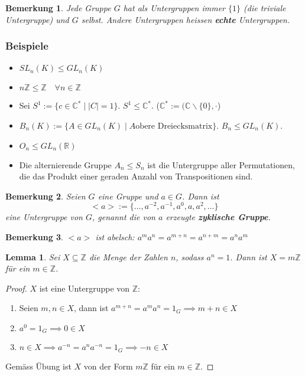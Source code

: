 \documentclass{article}
\theoremstyle{plain}
\newtheorem{lemma}{Lemma}
\newtheorem{bemerkung}{Bemerkung}
\newcommand{\defn}[1]{\textbf{#1}}
\newcommand{\defeq}{:=}
\newcommand{\R}{\mathbb{R}}
\newcommand{\C}{\mathbb{C}}
\newcommand{\Z}{\mathbb{Z}}
\newcommand{\zykl}[1]{{<}{#1}{>}}
\begin{document}
\begin{bemerkung}
    Jede Gruppe $G$ hat als Untergruppen immer $\{1\}$ (die triviale Untergruppe) und $G$ selbst. Andere Untergruppen heissen \defn{echte} Untergruppen.
\end{bemerkung}
\subsubsection*{Beispiele}
\begin{itemize}
    \item $SL_n(K) \leq GL_n(K)$
    \item $n\Z\leq \Z\quad \forall n\in\Z$
    \item Sei $S^1 \defeq \{c\in\C^*\mid |C|=1\}$. $S^1\leq \C^*$. ($\C^*\defeq (\C\backslash\{0\}, \cdot$)
    \item $B_n(K) \defeq \{A\in GL_n(K)\mid A \text{obere Dreiecksmatrix}\}$. $B_n\leq GL_n(K)$.
    \item $O_n\leq GL_n(\R)$
    \item Die alternierende Gruppe $A_n\leq S_n$ ist die Untergruppe aller Permutationen, die das Produkt einer geraden Anzahl von Transpositionen sind.
\end{itemize}
\begin{bemerkung}
    Seien $G$ eine Gruppe und $a\in G$. Dann ist $$\zykl{a}\defeq\{\ldots, a^{-2}, a^{-1}, a^0, a, a^2,\ldots\}$$ eine Untergruppe von $G$, genannt die von $a$ erzeugte \defn{zyklische Gruppe}.
\end{bemerkung}

\begin{bemerkung}
    $\zykl{a}$ ist abelsch: $a^ma^n=a^{m+n}=a^{n+m}=a^na^m$
\end{bemerkung}

\begin{lemma}
    Sei $X\subseteq\Z$ die Menge der Zahlen $n$, sodass $a^n=1$. Dann ist $X=m\Z$ für ein $m\in\Z$.
\end{lemma}
\begin{proof}
    $X$ ist eine Untergruppe von $\Z$:
    \begin{enumerate}[label=(\alph*)]
        \item Seien $m,n\in X$, dann ist $a^{m+n}=a^ma^n=1_G\implies m+n\in X$
        \item $a^0=1_G\implies 0\in X$
        \item $n\in X\implies a^{-n}=a^na^{-n}=1_G\implies -n\in X$
    \end{enumerate}
    Gemäss Übung ist $X$ von der Form $m\Z$ für ein $m\in\Z$.
\end{proof}
\end{document}

